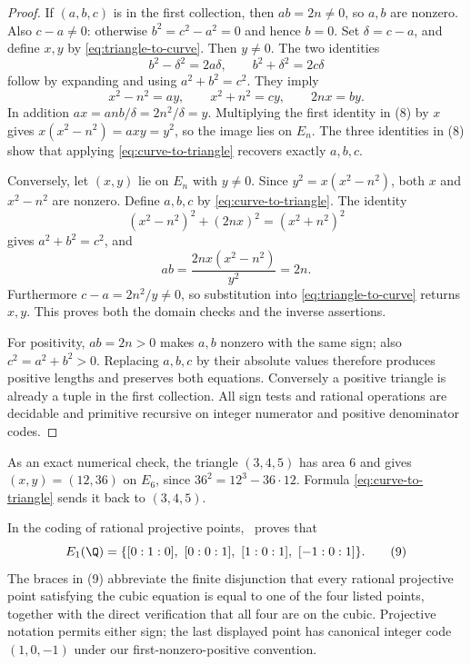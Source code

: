 \begin{proof}
If $(a,b,c)$ is in the first collection, then $ab=2n\ne0$, so $a,b$ are
nonzero.  Also $c-a\ne0$: otherwise $b^2=c^2-a^2=0$ and hence $b=0$.
Set $\delta=c-a$, and define $x,y$ by
\eqref{eq:triangle-to-curve}.  Then $y\ne0$.  The two identities
\[
 b^2-\delta^2=2a\delta,\qquad
 b^2+\delta^2=2c\delta
\]
follow by expanding and using $a^2+b^2=c^2$.  They imply
\[
 x^2-n^2=ay,\qquad x^2+n^2=cy,
 \qquad 2nx=by.
 \tag{8}
\]
In addition $ax=anb/\delta=2n^2/\delta=y$.  Multiplying the first
identity in (8) by $x$ gives
$x(x^2-n^2)=axy=y^2$, so the image lies on $E_n$.
The three identities in (8) show that applying
\eqref{eq:curve-to-triangle} recovers exactly $a,b,c$.

Conversely, let $(x,y)$ lie on $E_n$ with $y\ne0$.  Since
$y^2=x(x^2-n^2)$, both $x$ and $x^2-n^2$ are nonzero.  Define $a,b,c$
by \eqref{eq:curve-to-triangle}.  The identity
\[
 (x^2-n^2)^2+(2nx)^2=(x^2+n^2)^2
\]
gives $a^2+b^2=c^2$, and
\[
 ab=\frac{2nx(x^2-n^2)}{y^2}=2n.
\]
Furthermore $c-a=2n^2/y\ne0$, so substitution into
\eqref{eq:triangle-to-curve} returns $x,y$.  This proves both the domain
checks and the inverse assertions.

For positivity, $ab=2n>0$ makes $a,b$ nonzero with the same sign; also
$c^2=a^2+b^2>0$.  Replacing $a,b,c$ by their absolute values therefore
produces positive lengths and preserves both equations.  Conversely a
positive triangle is already a tuple in the first collection.  All sign
tests and rational operations are decidable and primitive recursive on
integer numerator and positive denominator codes.
\end{proof}

As an exact numerical check, the triangle $(3,4,5)$ has area $6$ and gives
$(x,y)=(12,36)$ on $E_6$, since $36^2=12^3-36\cdot12$.  Formula
\eqref{eq:curve-to-triangle} sends it back to $(3,4,5)$.

\begin{theorem}\label{thm:E1}
In the coding of rational projective points, \iPRA\ proves that
\[
 E_1(\Q)=\{[0:1:0],\ [0:0:1],\ [1:0:1],\ [-1:0:1]\}.
 \tag{9}
\]
The braces in (9) abbreviate the finite disjunction that every rational
projective point satisfying the cubic equation is equal to one of the four
listed points, together with the direct verification that all four are on
the cubic.
Projective notation permits either sign; the last displayed point has
canonical integer code $(1,0,-1)$ under our first-nonzero-positive convention.
\end{theorem}

